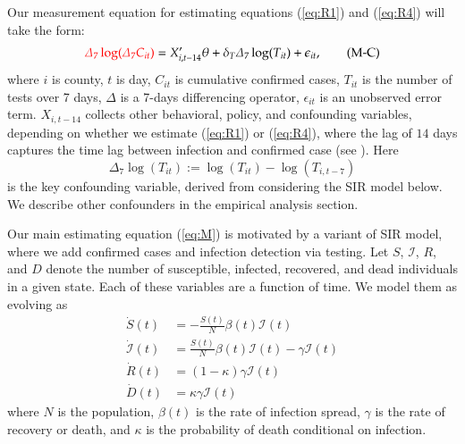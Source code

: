 \documentclass[9pt,twoside,lineno]{pnas-new}
\theoremstyle{definition}
\providecommand{\Infected}{{\mathcal{I}}}
\providecommand{\Recovered}{{R}}
\def\ycolor{\color{red}}
\begin{document}
Our measurement equation for estimating equations (\ref{eq:R1}) and (\ref{eq:R4}) will take the form:
\begin{align}
{\ycolor \Delta_7 \log(\Delta_7 C_{it})}  =    X_{i,t-14} '   \theta  +  \delta_T \Delta_7   \log(T_{it})  + \epsilon_{it},
 \label{eq:M} \tag{M-C}
\end{align}
where $i$ is county, $t$ is day, $C_{it}$ is cumulative confirmed
cases, $T_{it}$ is the number of tests over 7 days, $\Delta$ is
a 7-days differencing operator, $\epsilon_{it}$ is an unobserved error term.
 $X_{i,t-14}$  collects other behavioral, policy, and confounding variables, depending
on whether we estimate (\ref{eq:R1}) or (\ref{eq:R4}), where the lag of $14$ days captures the time lag between infection and confirmed case (see \cite{midas2020}). %
   Here
$$\Delta_7   \log(T_{it} ):=  \log(T_{it}) - \log(T_{i,t-7})  $$ %
is the key confounding variable,
derived from considering the SIR model below. We describe other confounders in the empirical analysis section.


 Our main estimating equation (\ref{eq:M}) is motivated by a variant of SIR
model, where we add confirmed cases and infection detection via testing.
Let $S$, $\Infected$, $\Recovered$, and $D$ denote the number of susceptible,
infected, recovered, and dead individuals in a given state. Each of these variables are a function of time. We model
them as evolving as
\begin{align}
  \dot{S}(t) & = -\frac{S(t)}{N} \beta(t) \Infected(t) \label{eq:s} \\
  \dot{\Infected}(t) & = \frac{S(t)}{N} \beta(t) \Infected(t) - \gamma  \Infected(t) \label{eq:i}\\
  \dot{\Recovered}(t) & = (1-\kappa) \gamma  \Infected(t) \label{eq:r}\\ %
  \dot{D}(t) & = \kappa \gamma \Infected(t) %
  \label{eq:d}
\end{align}
where $N$ is the population, $\beta(t)$ is the rate of infection
spread, $\gamma$ is the rate of recovery or death, and $\kappa$ is the
probability of death conditional on infection.
\end{document}
